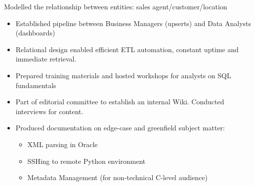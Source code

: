 \documentclass[../cv.tex]{subfiles}
\begin{document}
\begin{description}[style=multiline, leftmargin=3.5cm]
	\item[Sales Relational Model\\ \textnormal{Oracle}]
	      Modelled the relationship between entities: sales agent/customer/location
	      \begin{itemize}
		      \item Established pipeline between Business Managers (upserts) and Data Analysts (dashboards)
		      \item Relational design enabled efficient ETL automation, constant uptime and immediate retrieval.
	      \end{itemize}
	\item[Training \& Documentation \\ \textnormal{Markdown}]
		\begin{itemize}
		\item Prepared training materials and hosted workshops for analysts on SQL fundamentals
		\item Part of editorial committee to establish an internal Wiki. Conducted interviews for content.
		\item Produced documentation on edge-case and greenfield subject matter:
	      \begin{itemize}
		      \item XML parsing in Oracle
		      \item SSHing to remote Python environment
		      \item Metadata Management (for non-technical C-level audience)
		  \end{itemize}
		\end{itemize}
\end{description}
\end{document}
